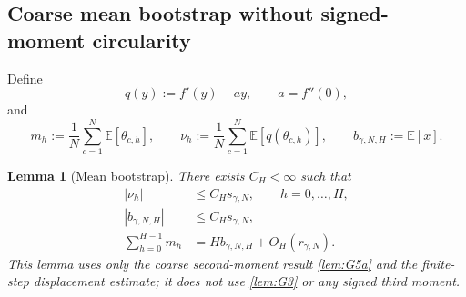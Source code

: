 \documentclass[11pt]{article}
\newtheorem{lemma}[lemma]{Lemma}
\theoremstyle{definition}
\newcommand{\E}{\mathbb{E}}
\newcommand{\smallscale}{s_{\gamma,N}}
\newcommand{\remscale}{r_{\gamma,N}}
\newcommand{\bstat}{b_{\gamma,N,H}}
\begin{document}
\subsection{Coarse mean bootstrap without signed-moment circularity}

Define
\[
  q(y):=f'(y)-ay,
  \qquad a=f''(0),
\]
and
\[
  m_h:=\frac1N\sum_{c=1}^N\E[\theta_{c,h}],
  \qquad
  \nu_h:=\frac1N\sum_{c=1}^N\E[q(\theta_{c,h})],
  \qquad
  \bstat:=\E[x].
\]

\begin{lemma}[Mean bootstrap]
\label{lem:G8}
There exists $C_H<\infty$ such that
\begin{align}
  |\nu_h|&\le C_H\smallscale,\qquad h=0,\ldots,H,             \label{eq:nu-coarse}\\
  |\bstat|&\le C_H\smallscale,                                \label{eq:b-coarse}\\
  \sum_{h=0}^{H-1}m_h&=H\bstat+O_H(\remscale).                \label{eq:G8-sum}
\end{align}
This lemma uses only the coarse second-moment result \cref{lem:G5a} and the finite-step displacement estimate; it does not use \cref{lem:G3} or any signed third moment.
\end{lemma}
\end{document}
